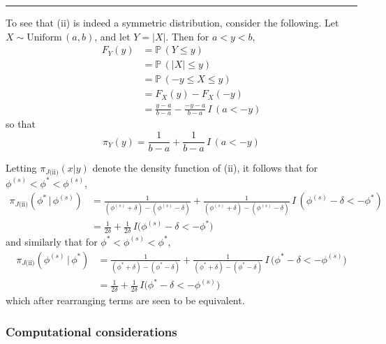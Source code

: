\documentclass[11pt]{article}
\newcommand{\prob}{\mathbb{P}\,}
\newcommand{\barS}{\,|\,}
\newcommand{\ind}{I}
\begin{document}
\vspace{4mm} \begin{center} \rule{1.0\textwidth}{0.25mm} \end{center} \vspace{4mm}
\noindent To see that (ii) is indeed a symmetric distribution, consider the following.  Let $X \sim \text{Uniform}\, (a,b)$, and let $Y = |X|$.  Then for $a < y < b$,
\begin{align*}
F_Y(y) &= \prob(Y \leq y) \\[1ex]
&= \prob(|X| \leq y) \\[1ex]
&= \prob(-y \leq X \leq y) \\[1ex]
&= F_X(y) - F_X(-y) \\[1ex]
&= \frac{ y-a }{ b-a } - \frac{ -y-a }{ b-a }\, \ind\,(a < -y)
\end{align*}
so that
\[ \pi_Y(y) = \frac{ 1 }{ b-a } + \frac{ 1 }{ b - a }\, \ind\,(a < -y)  \] \vspace{4mm}

\noindent Letting $\pi_{J\text{(ii)}} \left( x | y \right)$ denote the density function of (ii), it follows that for $\phi^{(s)} < \phi^* < \phi^{(s)}$,
\begin{align*}
\pi_{J\text{(ii)}} \left( \phi^* \barS \phi^{(s)} \right) &= \frac{ 1 }{ (\phi^{(s)} + \delta) - (\phi^{(s)} - \delta) } + \frac{ 1 }{ (\phi^{(s)} + \delta) - (\phi^{(s)} - \delta) }\, \ind\,(\phi^{(s)} - \delta < -\phi^*)  \\[1ex]
&= \frac{ 1 }{ 2\delta } + \frac{ 1 }{ 2\delta }\, \ind\big(\phi^{(s)} - \delta < -\phi^{*}\big)
\end{align*}
and similarly that for $\phi^{*} < \phi^{(s)} < \phi^{*}$,
\begin{align*} \pi_{J\text{(ii)}} \left( \phi^{(s)} \barS \phi^{*} \right) &= \frac{ 1 }{ (\phi^{*} + \delta) - (\phi^{*} - \delta) } + \frac{ 1 }{ (\phi^{*} + \delta) - (\phi^{*} - \delta) }\, \ind\,(\phi^{*} - \delta < -\phi^{(s)}\big) \\[1ex]
&= \frac{ 1 }{ 2\delta } + \frac{ 1 }{ 2\delta }\, \ind\big(\phi^{*} - \delta < -\phi^{(s)}\big)
\end{align*}
which after rearranging terms are seen to be equivalent.





\subsubsection{Computational considerations}
\end{document}
